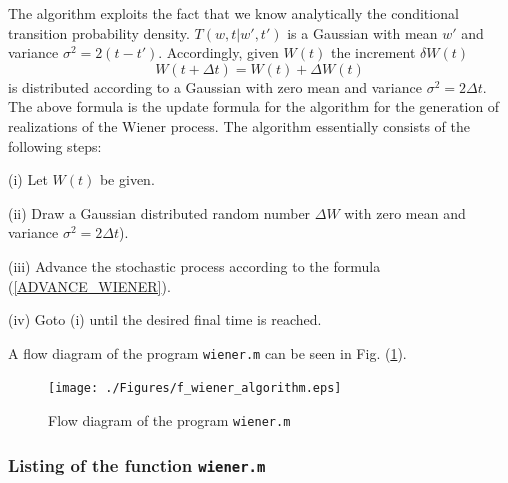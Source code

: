 The algorithm exploits the fact that we know analytically the
conditional transition probability density. $T(w,t|w',t')$ is a 
Gaussian  with  mean $w'$ and variance $\sigma^2=2(t-t')$.
Accordingly, given $W(t)$ the increment $\delta W(t)$
\begin{equation}
\label{ADVANCE_WIENER}
W(t+\Delta t) = W(t) + \Delta W(t)
\end{equation}
is distributed according to a Gaussian with zero mean and variance
$\sigma^2=2\Delta t$. The above formula is the update formula
for the algorithm for the generation of realizations of the Wiener
process. The algorithm essentially consists of the following 
steps:

(i) Let $W(t)$ be given.

(ii) Draw a Gaussian distributed random number $\Delta W$
with zero mean and variance $\sigma^2=2\Delta t$).

(iii) Advance the stochastic process according to the formula
(\ref{ADVANCE_WIENER}).

(iv) Goto (i) until the desired final time is reached.

A flow diagram of the program \texttt{wiener.m} can be seen in 
Fig. (\ref{F_WIENER_ALGORITHM}). 
\begin{figure}
\label{F_WIENER_ALGORITHM}
\texttt{[image: ./Figures/f\_wiener\_algorithm.eps]}
\caption{Flow diagram of the program \texttt{wiener.m}}
\end{figure}
\subsubsection{Listing of the function \texttt{wiener.m}}

